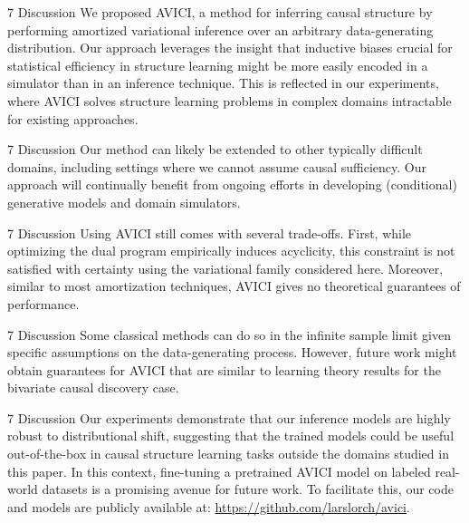 \documentclass[aspectratio=169,10pt]{beamer}
\newcommand{\ours}{AVICI\xspace}
\begin{document}
\begin{frame}{7 Discussion}
We proposed \ours, a method for inferring causal structure by performing amortized variational inference over an arbitrary data-generating distribution. Our approach leverages the insight that inductive biases crucial for statistical efficiency in structure learning might be more easily encoded in a simulator than in an inference technique. This is reflected in our experiments, where \ours solves structure learning problems in complex domains intractable for existing approaches.
\end{frame}

\begin{frame}{7 Discussion}
Our method can likely be extended to other typically difficult domains, including settings where we cannot assume causal sufficiency. Our approach will continually benefit from ongoing efforts in developing (conditional) generative models and domain simulators.
\end{frame}

\begin{frame}{7 Discussion}
Using \ours still comes with several trade-offs. First, while optimizing the dual program empirically induces acyclicity, this constraint is not satisfied with certainty using the variational family considered here. Moreover, similar to most amortization techniques, \ours gives no theoretical guarantees of performance.
\end{frame}

\begin{frame}{7 Discussion}
Some classical methods can do so in the infinite sample limit given specific assumptions on the data-generating process. However, future work might obtain guarantees for \ours that are similar to learning theory results for the bivariate causal discovery case.
\end{frame}

\begin{frame}{7 Discussion}
Our experiments demonstrate that our inference models are highly robust to distributional shift, suggesting that the trained models could be useful out-of-the-box in causal structure learning tasks outside the domains studied in this paper. In this context, fine-tuning a pretrained \ours model on labeled real-world datasets is a promising avenue for future work. To facilitate this, our code and models are publicly available at: \url{https://github.com/larslorch/avici}.
\end{frame}
\end{document}
